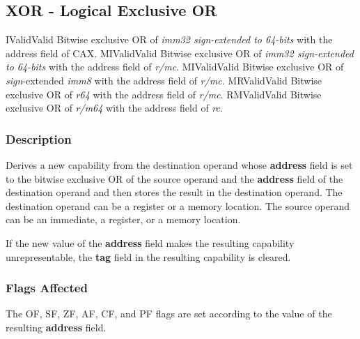 \clearpage
{}
{}
\subsection*{XOR - Logical Exclusive OR}

\begin{x86opcodetable}
  {I}{Valid}{Valid}
  {Bitwise exclusive OR of \emph{imm32 sign-extended to 64-bits} with
    the address field of CAX.}
  {MI}{Valid}{Valid}
  {Bitwise exclusive OR of \emph{imm32 sign-extended to 64-bits} with
    the address field of \emph{r/mc}.}
  {MI}{Valid}{Valid}
  {Bitwise exclusive OR of \emph{sign}-extended \emph{imm8} with the
    address field of \emph{r/mc}.}
  {MR}{Valid}{Valid}
  {Bitwise exclusive OR of \emph{r64} with the address field of \emph{r/mc}.}
  {RM}{Valid}{Valid}
  {Bitwise exclusive OR of \emph{r/m64} with the address field of \emph{rc}.}
\end{x86opcodetable}

\begin{x86opentable}
\end{x86opentable}

\subsubsection*{Description}

Derives a new capability from the destination operand whose
\textbf{address} field is set to the bitwise exclusive OR of the
source operand and the \textbf{address} field of the destination
operand and then stores the result in the destination operand. The
destination operand can be a register or a memory location. The source
operand can be an immediate, a register, or a memory location.

If the new value of the \textbf{address} field makes the resulting
capability unrepresentable, the \textbf{tag} field in the resulting
capability is cleared.

\subsubsection*{Flags Affected}

The OF, SF, ZF, AF, CF, and PF flags are set according to the value of
the resulting \textbf{address} field.
